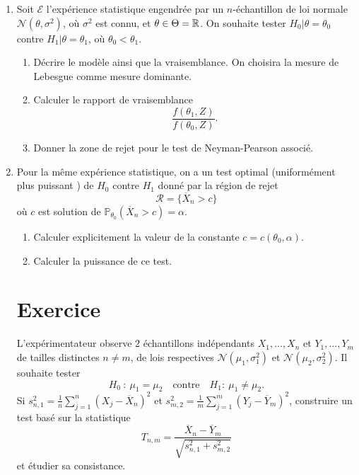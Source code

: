 \begin{enumerate}
\item Soit $\mathcal E$ l'expérience statistique engendrée par un $n$-échantillon de loi normale $\mathcal N (\theta,\sigma^2)$, où $\sigma^2$ est connu, et $\theta\in \Theta =\mathbb R$. On souhaite tester $H_0| \theta = \theta_0$ contre $H_1| \theta= \theta_1$, où $\theta_0<\theta_1$.
\begin{enumerate}
\item Décrire le modèle ainsi que la vraisemblance. On choisira la mesure de Lebesgue comme mesure dominante.
\item Calculer le rapport de vraisemblance \[\frac{f(\theta_1,Z)}{f(\theta_0,Z)}.\]
\item Donner la zone de rejet pour le test de Neyman-Pearson associé.
\end{enumerate}

\item Pour la même expérience statistique, on a un test optimal (uniformément plus puissant ) de $H_0$ contre $H_1$ donné par la région de rejet 
\[\mathcal R = \{\overline X_n >c\}\]
où $c$ est solution de $\mathbb P_{\theta_0}(\overline X_n > c)=\alpha$.
\begin{enumerate}
\item Calculer explicitement la valeur de la constante $c=c(\theta_0,\alpha)$.
\item Calculer la puissance de ce test.
\end{enumerate}

\section{Exercice}
L'expérimentateur observe $2$ échantillons indépendants $X_1,...,X_n$ et $Y_1,...,Y_m$ de tailles distinctes $n\neq m$, de lois respectives $\mathcal N(\mu_1,\sigma^2_1)$ et $\mathcal N(\mu_2,\sigma^2_2)$. Il souhaite tester
\[H_0\ : \ \mu_1=\mu_2 \quad \text{contre} \quad H_1  : \ \mu_1\neq \mu_2 .\]
Si $s_{n,1}^2 = \frac{1}{n}\sum_{j=1}^n (X_j-\overline X_n)^2$ et $s_{m,2}^2 = \frac{1}{m}\sum_{j=1}^m (Y_j-\overline Y_m)^2$, construire un test basé sur la statistique 
\[T_{n,m}=\frac{\overline X_n - \overline Y_m}{\sqrt{s_{n,1}^2+s_{m,2}^2}}\]
et étudier sa consistance.
\end{enumerate}
